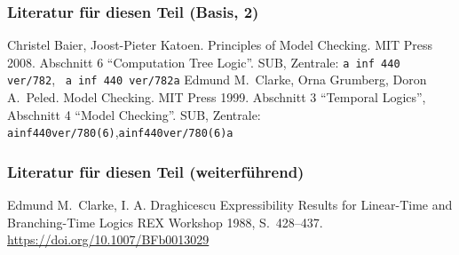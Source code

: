     \begin{frame}
      \frametitle{Literatur für diesen Teil (Basis, 2)}
      \begin{small}
        \begin{thebibliography}{99}
            Christel Baier, Joost-Pieter Katoen.
            \newblock
            Principles of Model Checking.
            \newblock
            MIT Press 2008.
            \newblock
            Abschnitt 6 "`Computation Tree Logic"'.
            \newblock
            SUB, Zentrale:
            \texttt{a inf 440 ver/782},~ \texttt{a inf 440 ver/782a}
            Edmund M.\ Clarke, Orna Grumberg, Doron A.\ Peled.
            \newblock
            Model Checking.
            \newblock
            MIT Press 1999.
            \newblock
            Abschnitt 3 "`Temporal Logics"',\\
            Abschnitt 4 "`Model Checking"'.
            \newblock
            SUB, Zentrale:
            \texttt{a\hfill inf\hfill 440\hfill ver/780(6)},\hfill\hfill  \texttt{a\hfill inf\hfill 440\hfill ver/780(6)a}
        \end{thebibliography}
        \par
      \end{small}
      \note{~}
    \end{frame}

    \begin{frame}
      \frametitle{Literatur für diesen Teil (weiterführend)}
      \begin{small}
        \begin{thebibliography}{99}
            Edmund M.\ Clarke, I. A. Draghicescu
            \newblock
            Expressibility Results for Linear-Time and Branching-Time Logics
            \newblock
            REX Workshop 1988, S.\ 428--437.
            \newblock
            \url{https://doi.org/10.1007/BFb0013029}
        \end{thebibliography}
        \par
      \end{small}
      \note{~}
    \end{frame}


  

